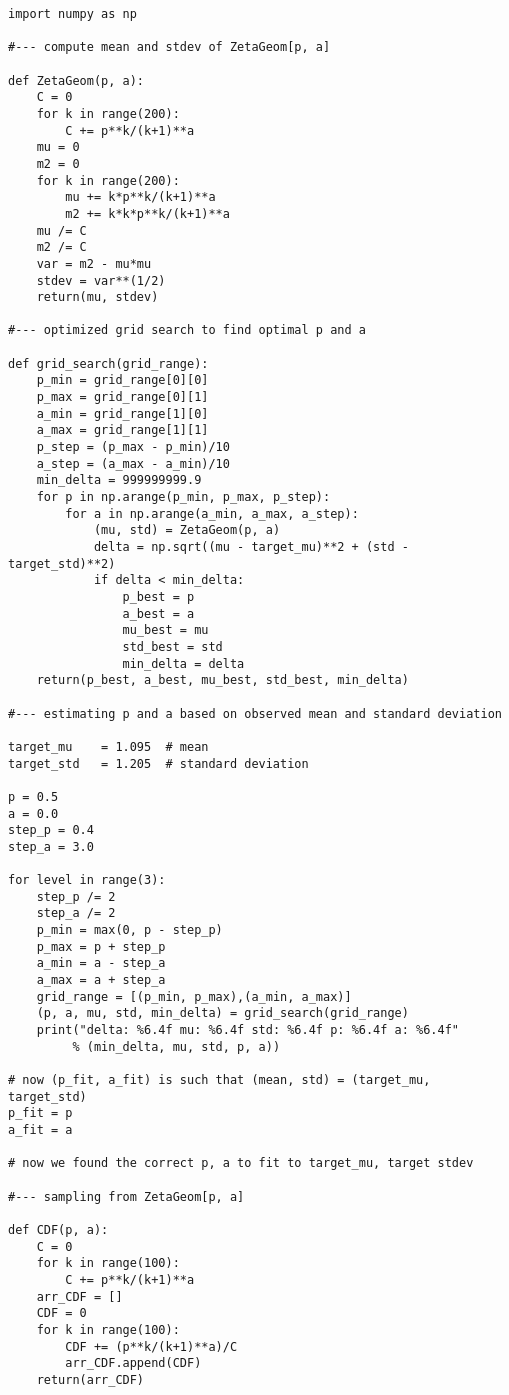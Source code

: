 \documentclass[oneside,10pt]{book}
\begin{document}
\begin{lstlisting}
import numpy as np

#--- compute mean and stdev of ZetaGeom[p, a]

def ZetaGeom(p, a):
    C = 0
    for k in range(200):
        C += p**k/(k+1)**a
    mu = 0
    m2 = 0
    for k in range(200):
        mu += k*p**k/(k+1)**a
        m2 += k*k*p**k/(k+1)**a
    mu /= C
    m2 /= C
    var = m2 - mu*mu
    stdev = var**(1/2)
    return(mu, stdev)

#--- optimized grid search to find optimal p and a

def grid_search(grid_range):
    p_min = grid_range[0][0]
    p_max = grid_range[0][1]
    a_min = grid_range[1][0]
    a_max = grid_range[1][1]
    p_step = (p_max - p_min)/10
    a_step = (a_max - a_min)/10
    min_delta = 999999999.9
    for p in np.arange(p_min, p_max, p_step):
        for a in np.arange(a_min, a_max, a_step):
            (mu, std) = ZetaGeom(p, a)
            delta = np.sqrt((mu - target_mu)**2 + (std - target_std)**2)
            if delta < min_delta:
                p_best = p
                a_best = a
                mu_best = mu
                std_best = std
                min_delta = delta
    return(p_best, a_best, mu_best, std_best, min_delta)

#--- estimating p and a based on observed mean and standard deviation

target_mu    = 1.095  # mean
target_std   = 1.205  # standard deviation

p = 0.5
a = 0.0
step_p = 0.4
step_a = 3.0

for level in range(3):
    step_p /= 2
    step_a /= 2
    p_min = max(0, p - step_p)
    p_max = p + step_p
    a_min = a - step_a
    a_max = a + step_a
    grid_range = [(p_min, p_max),(a_min, a_max)]
    (p, a, mu, std, min_delta) = grid_search(grid_range)
    print("delta: %6.4f mu: %6.4f std: %6.4f p: %6.4f a: %6.4f" 
         % (min_delta, mu, std, p, a))

# now (p_fit, a_fit) is such that (mean, std) = (target_mu, target_std)
p_fit = p  
a_fit = a

# now we found the correct p, a to fit to target_mu, target stdev

#--- sampling from ZetaGeom[p, a]

def CDF(p, a):
    C = 0
    for k in range(100):
        C += p**k/(k+1)**a
    arr_CDF = []
    CDF = 0
    for k in range(100):
        CDF += (p**k/(k+1)**a)/C
        arr_CDF.append(CDF)
    return(arr_CDF)


\end{lstlisting}
\end{document}
